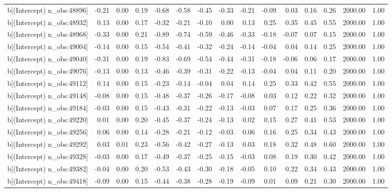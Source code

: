 \begin{table}[ht]
\begin{tabular}{rrrrrrrrrrrrrrr}
  b[(Intercept) n\_obs:48896] & -0.21 & 0.00 & 0.19 & -0.68 & -0.58 & -0.45 & -0.33 & -0.21 & -0.09 & 0.03 & 0.16 & 0.26 & 2000.00 & 1.00 \\ 
  b[(Intercept) n\_obs:48932] & 0.13 & 0.00 & 0.17 & -0.32 & -0.21 & -0.10 & 0.00 & 0.13 & 0.25 & 0.35 & 0.45 & 0.55 & 2000.00 & 1.00 \\ 
  b[(Intercept) n\_obs:48968] & -0.33 & 0.00 & 0.21 & -0.89 & -0.74 & -0.59 & -0.46 & -0.33 & -0.18 & -0.07 & 0.07 & 0.15 & 2000.00 & 1.00 \\ 
  b[(Intercept) n\_obs:49004] & -0.14 & 0.00 & 0.15 & -0.54 & -0.41 & -0.32 & -0.24 & -0.14 & -0.04 & 0.04 & 0.14 & 0.25 & 2000.00 & 1.00 \\ 
  b[(Intercept) n\_obs:49040] & -0.31 & 0.00 & 0.19 & -0.83 & -0.69 & -0.54 & -0.44 & -0.31 & -0.18 & -0.06 & 0.06 & 0.17 & 2000.00 & 1.00 \\ 
  b[(Intercept) n\_obs:49076] & -0.13 & 0.00 & 0.13 & -0.46 & -0.39 & -0.31 & -0.22 & -0.13 & -0.04 & 0.04 & 0.11 & 0.20 & 2000.00 & 1.00 \\ 
  b[(Intercept) n\_obs:49112] & 0.14 & 0.00 & 0.15 & -0.23 & -0.14 & -0.04 & 0.04 & 0.14 & 0.25 & 0.33 & 0.42 & 0.55 & 2000.00 & 1.00 \\ 
  b[(Intercept) n\_obs:49148] & -0.08 & 0.00 & 0.15 & -0.48 & -0.37 & -0.26 & -0.17 & -0.08 & 0.03 & 0.12 & 0.22 & 0.32 & 2000.00 & 1.00 \\ 
  b[(Intercept) n\_obs:49184] & -0.03 & 0.00 & 0.15 & -0.43 & -0.31 & -0.22 & -0.13 & -0.03 & 0.07 & 0.17 & 0.25 & 0.36 & 2000.00 & 1.00 \\ 
  b[(Intercept) n\_obs:49220] & 0.01 & 0.00 & 0.20 & -0.45 & -0.37 & -0.24 & -0.13 & 0.02 & 0.15 & 0.27 & 0.41 & 0.53 & 2000.00 & 1.00 \\ 
  b[(Intercept) n\_obs:49256] & 0.06 & 0.00 & 0.14 & -0.28 & -0.21 & -0.12 & -0.03 & 0.06 & 0.16 & 0.25 & 0.34 & 0.43 & 2000.00 & 1.00 \\ 
  b[(Intercept) n\_obs:49292] & 0.03 & 0.01 & 0.23 & -0.56 & -0.42 & -0.27 & -0.13 & 0.03 & 0.18 & 0.32 & 0.48 & 0.60 & 2000.00 & 1.00 \\ 
  b[(Intercept) n\_obs:49328] & -0.03 & 0.00 & 0.17 & -0.49 & -0.37 & -0.25 & -0.15 & -0.03 & 0.08 & 0.19 & 0.30 & 0.42 & 2000.00 & 1.00 \\ 
  b[(Intercept) n\_obs:49382] & -0.04 & 0.00 & 0.20 & -0.53 & -0.43 & -0.30 & -0.18 & -0.05 & 0.10 & 0.22 & 0.34 & 0.43 & 2000.00 & 1.00 \\ 
  b[(Intercept) n\_obs:49418] & -0.09 & 0.00 & 0.15 & -0.44 & -0.38 & -0.28 & -0.19 & -0.09 & 0.01 & 0.09 & 0.21 & 0.30 & 2000.00 & 1.00 \\ 

\end{tabular}
\end{table}
